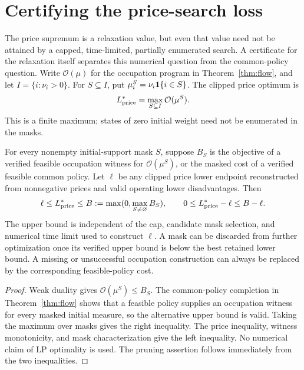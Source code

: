 \section{Certifying the price-search loss}\label{sec:price-completion50}
The price supremum is a relaxation value, but even that value need not be attained by a capped, time-limited, partially enumerated search. A certificate for the relaxation itself separates this numerical question from the common-policy question. Write $\mathcal O(\mu)$ for the occupation program in Theorem~\ref{thm:flow}, and let $I=\{i:\nu_i>0\}$. For $S\subseteq I$, put $\mu_i^S=\nu_i\mathbf 1\{i\in S\}$. The clipped price optimum is
\[
 L^*_{\rm price}=\max_{S\subseteq I}\mathcal O(\mu^S).
\]
This is a finite maximum; states of zero initial weight need not be enumerated in the masks.

\begin{proposition}\label{prop:portfolio50}
For every nonempty initial-support mask $S$, suppose $B_S$ is the objective of a verified feasible occupation witness for $\mathcal O(\mu^S)$, or the masked cost of a verified feasible common policy. Let $\ell$ be any clipped price lower endpoint reconstructed from nonnegative prices and valid operating lower disadvantages. Then
\begin{equation}\label{eq:portfolio50}
 \ell\le L^*_{\rm price}\le B:=\max(0,\max_{S\ne\varnothing}B_S),
 \qquad 0\le L^*_{\rm price}-\ell\le B-\ell.
\end{equation}
The upper bound is independent of the cap, candidate mask selection, and numerical time limit used to construct $\ell$. A mask can be discarded from further optimization once its verified upper bound is below the best retained lower bound. A missing or unsuccessful occupation construction can always be replaced by the corresponding feasible-policy cost.
\end{proposition}
\begin{proof}
Weak duality gives $\mathcal O(\mu^S)\le B_S$. The common-policy completion in Theorem~\ref{thm:flow} shows that a feasible policy supplies an occupation witness for every masked initial measure, so the alternative upper bound is valid. Taking the maximum over masks gives the right inequality. The price inequality, witness monotonicity, and mask characterization give the left inequality. No numerical claim of LP optimality is used. The pruning assertion follows immediately from the two inequalities.\end{proof}

